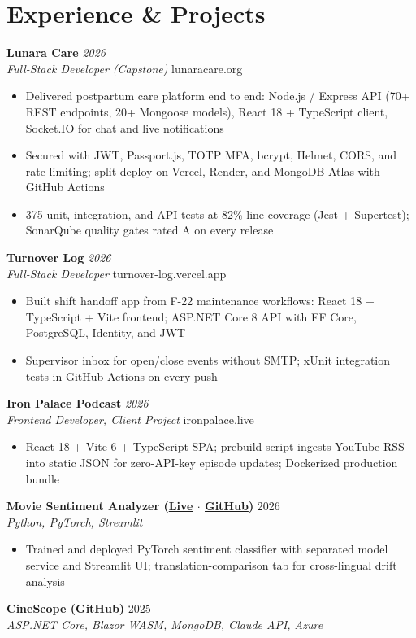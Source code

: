 \documentclass[10pt,letterpaper]{article}
\newcommand{\resumeHeading}[4]{
  \vspace{0pt}
  \textbf{#1} \hfill \textit{#2} \\
  \textit{#3} \hfill #4
}
\newcommand{\projectHeading}[3]{
  \vspace{0pt}
  \textbf{#1} \hfill #2 \\
  \textit{#3}
}
\begin{document}
\section{Experience \& Projects}
\resumeHeading{Lunara Care}{2026}{Full-Stack Developer (Capstone)}{lunaracare.org}
\begin{itemize}
  \item Delivered postpartum care platform end to end: Node.js / Express API (70+ REST endpoints, 20+ Mongoose models), React 18 + TypeScript client, Socket.IO for chat and live notifications
  \item Secured with JWT, Passport.js, TOTP MFA, bcrypt, Helmet, CORS, and rate limiting; split deploy on Vercel, Render, and MongoDB Atlas with GitHub Actions
  \item 375 unit, integration, and API tests at 82\% line coverage (Jest + Supertest); SonarQube quality gates rated A on every release
\end{itemize}
\resumeHeading{Turnover Log}{2026}{Full-Stack Developer}{turnover-log.vercel.app}
\begin{itemize}
  \item Built shift handoff app from F-22 maintenance workflows: React 18 + TypeScript + Vite frontend; ASP.NET Core 8 API with EF Core, PostgreSQL, Identity, and JWT
  \item Supervisor inbox for open/close events without SMTP; xUnit integration tests in GitHub Actions on every push
\end{itemize}
\resumeHeading{Iron Palace Podcast}{2026}{Frontend Developer, Client Project}{ironpalace.live}
\begin{itemize}
  \item React 18 + Vite 6 + TypeScript SPA; prebuild script ingests YouTube RSS into static JSON for zero-API-key episode updates; Dockerized production bundle
\end{itemize}
\projectHeading{Movie Sentiment Analyzer \textnormal{(\href{https://nlp-moviereview.streamlit.app/}{Live} $\cdot$ \href{https://github.com/omniV1/AIT-204-pair-programing/tree/main/NLP/Topic4_NLP}{GitHub})}}{2026}{Python, PyTorch, Streamlit}
\begin{itemize}
  \item Trained and deployed PyTorch sentiment classifier with separated model service and Streamlit UI; translation-comparison tab for cross-lingual drift analysis
\end{itemize}
\projectHeading{CineScope \textnormal{(\href{https://github.com/omniV1/CineScope}{GitHub})}}{2025}{ASP.NET Core, Blazor WASM, MongoDB, Claude API, Azure}
\end{document}
